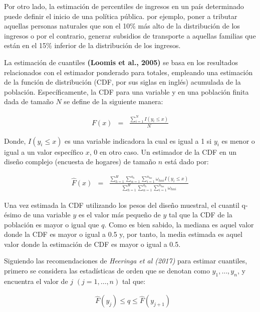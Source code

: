 \documentclass[
  12pt,
]{book}
\begin{document}
Por otro lado, la estimación de percentiles de ingresos en un país determinado puede definir el inicio de una política pública. por ejemplo, poner a tributar aquellas personas naturales que son el 10\% más alto de la distribución de los ingresos o por el contrario, generar subsidios de transporte a aquellas familias que están en el 15\% inferior de la distribución de los ingresos.

La estimación de cuantiles \textbf{(Loomis et al., 2005)} se basa en los resultados relacionados con el estimador ponderado para totales, empleando una estimación de la función de distribución (CDF, por sus siglas en inglés) acumulada de la población. Específicamente, la CDF para una variable y en una población finita dada de tamaño \(N\) se define de la siguiente manera:

\begin{eqnarray*}
F\left(x\right) & = & \frac{{ \sum_{i=1}^{N}}I\left(y_{i}\leq x\right)}{N}
\end{eqnarray*}

Donde, \(I\left(y_{i}\leq x\right)\) es una variable indicadora la
cual es igual a 1 si \(y_{i}\) es menor o igual a un valor específico
\(x\), 0 en otro caso. Un estimador de la CDF en un diseño complejo
(encuesta de hogares) de tamaño \(n\) está dado por:

\begin{eqnarray*}
\hat{F}\left(x\right) & = & \frac{\sum_{h=1}^{H}\sum_{\alpha=1}^{a_{h}}\sum_{i=1}^{n_{h\alpha}}\omega_{h\alpha i}I\left(y_{i}\leq x\right)}{\sum_{h=1}^{H}\sum_{\alpha=1}^{a_{h}}\sum_{i=1}^{n_{h\alpha}}\omega_{h\alpha i}}
\end{eqnarray*}

Una vez estimada la CDF utilizando los pesos del diseño muestral, el cuantil q-ésimo de una variable \(y\) es el valor más pequeño de \(y\) tal que la CDF de la población es mayor o igual que \(q\). Como es bien sabido, la mediana es aquel valor donde la CDF es mayor o igual a 0.5 y, por tanto, la media estimada es aquel valor donde la estimación de CDF es mayor o igual a 0.5.

Siguiendo las recomendaciones de \emph{Heeringa et al (2017)} para estimar cuantiles, primero se considera las estadísticas de orden que se denotan como \(y_{1},\ldots,y_{n}\), y encuentra el valor de \(j\) \((j=1,\ldots,n)\) tal que:

\begin{eqnarray*}
 & \hat{F}\left(y_{j}\right)\leq q\leq\hat{F}\left(y_{j+1}\right)
\end{eqnarray*}
\end{document}

